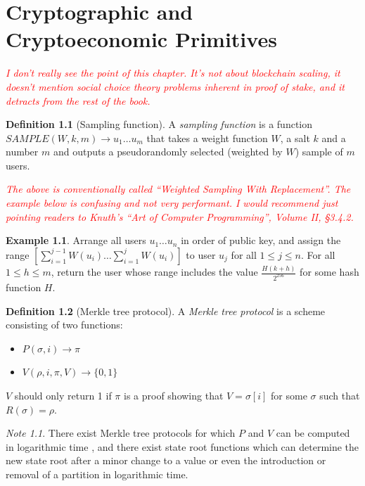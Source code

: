 \documentclass[11pt,a4paper]{report}
\newcommand{\comment}[1]{\textcolor{red}{\textit{#1}}}
\theoremstyle{plain}
\theoremstyle{definition}
\newtheorem{defn}{Definition}[chapter]
\newtheorem{exmp}{Example}[section]
\theoremstyle{remark}
\newtheorem*{note}{Note}
\begin{document}
\chapter{Cryptographic and Cryptoeconomic Primitives}

\comment{I don't really see the point of this chapter.  It's not about blockchain scaling, it doesn't mention social choice theory problems inherent in proof of stake, and it detracts from the rest of the book.}

\begin{defn}[Sampling function]
A \emph{sampling function} is a function $SAMPLE(W, k, m) \rightarrow {u_1 \ldots u_m}$ that takes a weight function $W$, a salt $k$ and a number $m$ and outputs a pseudorandomly selected (weighted by $W$) sample of $m$ users.
\end{defn}

\comment{The above is conventionally called ``Weighted Sampling With Replacement''.  The example below is confusing and not very performant.  I would recommend just pointing readers to Knuth's ``Art of Computer Programming'', Volume II,  \S 3.4.2.}

\begin{exmp}
Arrange all users $u_1 \ldots u_n$ in order of public key, and assign the range $[\sum_{i=1}^{j-1} W(u_i) \ldots \sum_{i=1}^j W(u_i)]$ to user $u_j$ for all $1 \leq j \leq n$. For all $1 \le h \le m$, return the user whose range includes the value $\frac{H(k + h)}{2^{256}}$ for some hash function $H$.
\end{exmp}

\begin{defn}[Merkle tree protocol]
A \emph{Merkle tree protocol} is a scheme consisting of two functions:
\begin{itemize}
\item
$P(\sigma, i) \rightarrow \pi$
\item
$V(\rho, i, \pi, V) \rightarrow \{0, 1\}$
\end{itemize}
$V$ should only return 1 if $\pi$ is a proof showing that $V = \sigma[i]$ for some $\sigma$ such that $R(\sigma) = \rho$.
\end{defn}

\begin{note}
There exist Merkle tree protocols for which $P$ and $V$ can be computed in logarithmic time \citep{merkle_method_1982}, and there exist state root functions which can determine the new state root after a minor change to a value or even the introduction or removal of a partition in logarithmic time.
\end{note}
\end{document}
